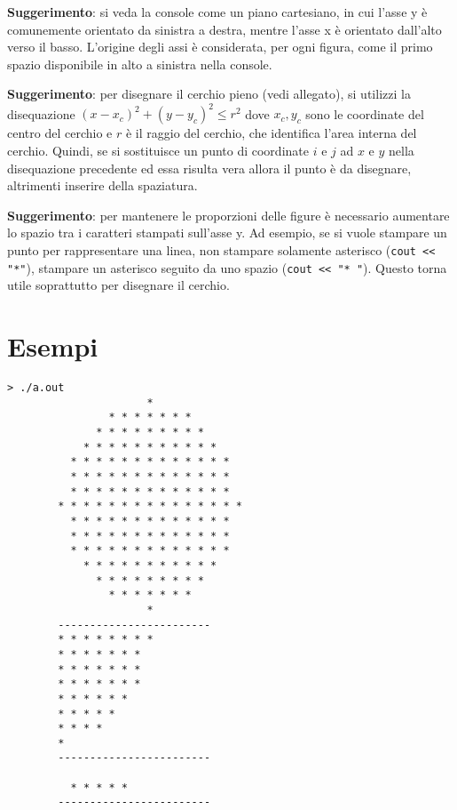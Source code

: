 \documentclass[addpoints,12pt,answers]{exam}
\begin{document}
    \vspace*{1em}

    \textbf{Suggerimento}: si veda la console come un piano cartesiano, in cui l'asse y è comunemente orientato da sinistra a destra, mentre l'asse x è orientato dall'alto verso il basso. L'origine degli assi è considerata, per ogni figura, come il primo spazio disponibile in alto a sinistra nella console.

    \vspace*{1em}

    \textbf{Suggerimento}: per disegnare il cerchio pieno (vedi allegato), si utilizzi la disequazione $(x-x_c)^2 + (y-y_c)^2 \leq r^2$ dove $x_c, y_c$ sono le coordinate del centro del cerchio e $r$ è il raggio del cerchio, che identifica l'area interna del cerchio. Quindi, se si sostituisce un punto di coordinate $i$ e $j$ ad $x$ e $y$ nella disequazione precedente ed essa risulta vera allora il punto è da disegnare, altrimenti inserire della spaziatura.

    \vspace*{1em}

    \textbf{Suggerimento}: per mantenere le proporzioni delle figure è necessario aumentare lo spazio tra i caratteri stampati sull'asse y. Ad esempio, se si vuole stampare un punto per rappresentare una linea, non stampare solamente asterisco (\texttt{cout << "*"}), stampare un asterisco seguito da uno spazio (\texttt{cout << "* "}). Questo torna utile soprattutto per disegnare il cerchio.
    
    \section{Esempi}
    
	\begin{lstlisting}[style=verbatim]
        > ./a.out
                      *               
                * * * * * * *         
              * * * * * * * * *       
            * * * * * * * * * * *     
          * * * * * * * * * * * * *   
          * * * * * * * * * * * * *   
          * * * * * * * * * * * * *   
        * * * * * * * * * * * * * * * 
          * * * * * * * * * * * * *   
          * * * * * * * * * * * * *   
          * * * * * * * * * * * * *   
            * * * * * * * * * * *     
              * * * * * * * * *       
                * * * * * * *         
                      *               
        ------------------------
        * * * * * * * * 
        * * * * * * *   
        * * * * * * *   
        * * * * * * *   
        * * * * * *     
        * * * * *       
        * * * *         
        *               
        ------------------------
        
          * * * * * 
        ------------------------
	\end{lstlisting}
    
\end{document}
